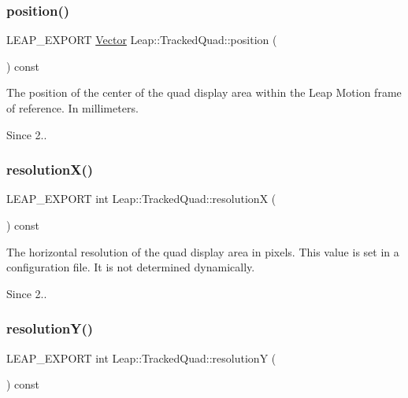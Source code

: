 \subsubsection{\texorpdfstring{position()}{position()}}
{\footnotesize\ttfamily L\+E\+A\+P\+\_\+\+E\+X\+P\+O\+RT \hyperlink{struct_leap_1_1_vector}{Vector} Leap\+::\+Tracked\+Quad\+::position (\begin{DoxyParamCaption}{ }\end{DoxyParamCaption}) const}

The position of the center of the quad display area within the Leap Motion frame of reference. In millimeters. 
\begin{DoxyCodeInclude}
\end{DoxyCodeInclude}
 \begin{DoxySince}{Since}
2.. 
\end{DoxySince}
\mbox{\label{class_leap_1_1_tracked_quad_a2adfad3946e7333ba91760161f9ec3f6}} 
\subsubsection{\texorpdfstring{resolution\+X()}{resolutionX()}}
{\footnotesize\ttfamily L\+E\+A\+P\+\_\+\+E\+X\+P\+O\+RT int Leap\+::\+Tracked\+Quad\+::resolutionX (\begin{DoxyParamCaption}{ }\end{DoxyParamCaption}) const}

The horizontal resolution of the quad display area in pixels. This value is set in a configuration file. It is not determined dynamically. 
\begin{DoxyCodeInclude}
\end{DoxyCodeInclude}
 \begin{DoxySince}{Since}
2.. 
\end{DoxySince}
\mbox{\label{class_leap_1_1_tracked_quad_ac74149a92d09d9549e934afc42eae434}} 
\subsubsection{\texorpdfstring{resolution\+Y()}{resolutionY()}}
{\footnotesize\ttfamily L\+E\+A\+P\+\_\+\+E\+X\+P\+O\+RT int Leap\+::\+Tracked\+Quad\+::resolutionY (\begin{DoxyParamCaption}{ }\end{DoxyParamCaption}) const}

